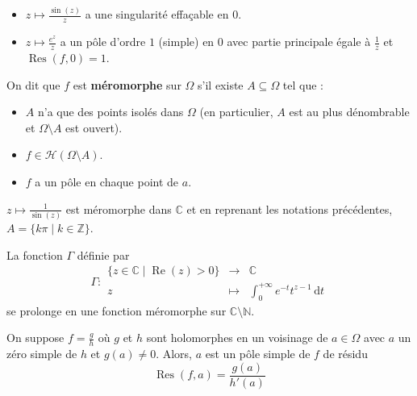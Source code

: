 	\begin{example}
		\begin{itemize}
			\item $z \mapsto \frac{\sin(z)}{z}$ a une singularité effaçable en $0$.
			\item $z \mapsto \frac{e^z}{z}$ a un pôle d'ordre $1$ (simple) en $0$ avec partie principale égale à $\frac{1}{z}$ et $\operatorname{Res}(f, 0) = 1$.
		\end{itemize}
	\end{example}

	\begin{definition}
		On dit que $f$ est \textbf{méromorphe} sur $\Omega$ s'il existe $A \subseteq \Omega$ tel que :
		\begin{itemize}
			\item $A$ n'a que des points isolés dans $\Omega$ (en particulier, $A$ est au plus dénombrable et $\Omega \setminus A$ est ouvert).
			\item $f \in \mathcal{H}(\Omega \setminus A)$.
			\item $f$ a un pôle en chaque point de $a$.
		\end{itemize}
	\end{definition}

	\begin{example}
		$z \mapsto \frac{1}{\sin(z)}$ est méromorphe dans $\mathbb{C}$ et en reprenant les notations précédentes, $A = \{ k\pi \mid k \in \mathbb{Z} \}$.
	\end{example}


	\begin{example}
		La fonction $\Gamma$ définie par
		\[
			\Gamma :
			\begin{array}{ccc}
				\{ z \in \mathbb{C} \mid \operatorname{Re}(z) > 0 \} &\rightarrow& \mathbb{C} \\
				z &\mapsto& \int_{0}^{+\infty} e^{-t} t^{z-1} \, \mathrm{d}t
			\end{array}
		\]
		se prolonge en une fonction méromorphe sur $\mathbb{C} \setminus \mathbb{N}$.
	\end{example}


	\begin{proposition}
		On suppose $f = \frac{g}{h}$ où $g$ et $h$ sont holomorphes en un voisinage de $a \in \Omega$ avec $a$ un zéro simple de $h$ et $g(a) \neq 0$. Alors, $a$ est un pôle simple de $f$ de résidu
		\[ \operatorname{Res}(f, a) = \frac{g(a)}{h'(a)} \]
	\end{proposition}

